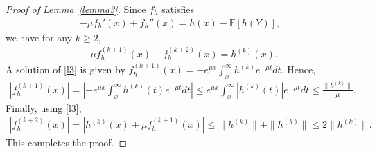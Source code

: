 \documentclass[11pt,letterpaper,reqno]{article}
\theoremstyle{thmstyleone}%
\theoremstyle{thmstyletwo}%
\theoremstyle{thmstylethree}%
\numberwithin{equation}{section}
\begin{document}
\begin{proof}[Proof of Lemma~\ref{lemma3}]
Since $f_h$ satisfies
\begin{align*}
    -\mu f_h'(x)+ f_h''(x)=h(x)-\mathbb E[h(Y)],
\end{align*}
we have for any $k\geq 2$,
\begin{align}\label{l3}
     -\mu f_h^{(k+1)}(x)+ f_h^{(k+2)}(x)=h^{(k)}(x).
\end{align}
A solution of \eqref{l3} is given by 
$f_h^{(k+1)}(x)=-e^{\mu x }\int_x^\infty h^{(k)}e^{-\mu t }dt.$
Hence,
\begin{align*}
    |f_h^{(k+1)}(x)|=\left|-e^{\mu x }\int_x^\infty h^{(k)}(t)e^{-\mu t }dt\right|
    \leq e^{\mu x }\int_x^\infty |h^{(k)}(t)|e^{-\mu t }dt
     \leq \frac{\|h^{(k)}\|}{\mu}.
\end{align*}
Finally, using \eqref{l3},
\begin{align*}
    | f_h^{(k+2)}(x)|=|h^{(k)}(x)+\mu f_h^{(k+1)}(x)|
     \leq \|h^{(k)}\|+\|h^{(k)}\|
    \leq 2\|h^{(k)}\|.
\end{align*}
This completes the proof. 
\end{proof}
\end{document}
